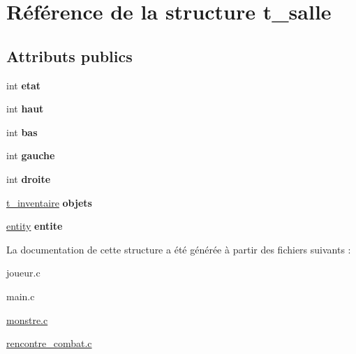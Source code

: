 \hypertarget{structt__salle}{\section{Référence de la structure t\-\_\-salle}
\label{structt__salle}
}
\subsection*{Attributs publics}
\begin{DoxyCompactItemize}
\item 
\hypertarget{structt__salle_a0cece605496c62d1c485cee39c492419}{int {\bfseries etat}}\label{structt__salle_a0cece605496c62d1c485cee39c492419}

\item 
\hypertarget{structt__salle_a8e99731d77d40b69bb5c5c3f32422c9f}{int {\bfseries haut}}\label{structt__salle_a8e99731d77d40b69bb5c5c3f32422c9f}

\item 
\hypertarget{structt__salle_adc2794cd8085d5be9b19da2ae36d8fa0}{int {\bfseries bas}}\label{structt__salle_adc2794cd8085d5be9b19da2ae36d8fa0}

\item 
\hypertarget{structt__salle_ae1720fd8a527db078b2082ea2fc6f92c}{int {\bfseries gauche}}\label{structt__salle_ae1720fd8a527db078b2082ea2fc6f92c}

\item 
\hypertarget{structt__salle_a19a2e3c2af4d5d8909e96c6dba9fa1f4}{int {\bfseries droite}}\label{structt__salle_a19a2e3c2af4d5d8909e96c6dba9fa1f4}

\item 
\hypertarget{structt__salle_af6e53dd9ab8cbe946aafd75ad0d7b29b}{\hyperlink{structt__inventaire}{t\-\_\-inventaire} {\bfseries objets}}\label{structt__salle_af6e53dd9ab8cbe946aafd75ad0d7b29b}

\item 
\hypertarget{structt__salle_a32c902a286c0c4db371f2f94c666d6cb}{\hyperlink{structentity}{entity} {\bfseries entite}}\label{structt__salle_a32c902a286c0c4db371f2f94c666d6cb}

\end{DoxyCompactItemize}


La documentation de cette structure a été générée à partir des fichiers suivants \-:\begin{DoxyCompactItemize}
\item 
joueur.\-c\item 
main.\-c\item 
\hyperlink{monstre_8c}{monstre.\-c}\item 
\hyperlink{rencontre__combat_8c}{rencontre\-\_\-combat.\-c}\end{DoxyCompactItemize}
